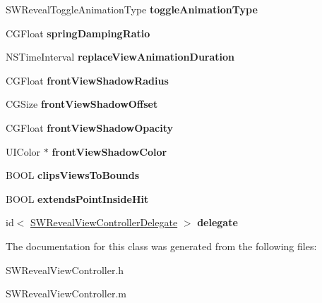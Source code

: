 \begin{DoxyCompactItemize}
S\+W\+Reveal\+Toggle\+Animation\+Type {\bfseries toggle\+Animation\+Type}
\item 
\mbox{\label{interface_s_w_reveal_view_controller_ab13107670e23ba44d44fb2bc3e662955}} 
C\+G\+Float {\bfseries spring\+Damping\+Ratio}
\item 
\mbox{\label{interface_s_w_reveal_view_controller_a54b61605e0cfe3cc2692299372d3064d}} 
N\+S\+Time\+Interval {\bfseries replace\+View\+Animation\+Duration}
\item 
\mbox{\label{interface_s_w_reveal_view_controller_a57ab4286f46ab7949c2018ab2eb29ae3}} 
C\+G\+Float {\bfseries front\+View\+Shadow\+Radius}
\item 
\mbox{\label{interface_s_w_reveal_view_controller_ad04e042f09c0992ec9becc7134915e67}} 
C\+G\+Size {\bfseries front\+View\+Shadow\+Offset}
\item 
\mbox{\label{interface_s_w_reveal_view_controller_abb94ae8956306d0d079786a775ea7a4a}} 
C\+G\+Float {\bfseries front\+View\+Shadow\+Opacity}
\item 
\mbox{\label{interface_s_w_reveal_view_controller_aa55a2d8147938467aa62dc50a3be0dac}} 
U\+I\+Color $\ast$ {\bfseries front\+View\+Shadow\+Color}
\item 
\mbox{\label{interface_s_w_reveal_view_controller_a6beabaa35a44abede02e6980254d0c39}} 
B\+O\+OL {\bfseries clips\+Views\+To\+Bounds}
\item 
\mbox{\label{interface_s_w_reveal_view_controller_a25a4e217603fcd5ce9c98ef59739ad25}} 
B\+O\+OL {\bfseries extends\+Point\+Inside\+Hit}
\item 
\mbox{\label{interface_s_w_reveal_view_controller_ac3a7d6fe43dfd4aa597b62c76343a642}} 
id$<$ \hyperlink{protocol_s_w_reveal_view_controller_delegate-p}{S\+W\+Reveal\+View\+Controller\+Delegate} $>$ {\bfseries delegate}
\end{DoxyCompactItemize}


The documentation for this class was generated from the following files\+:\begin{DoxyCompactItemize}
\item 
S\+W\+Reveal\+View\+Controller.\+h\item 
S\+W\+Reveal\+View\+Controller.\+m\end{DoxyCompactItemize}
